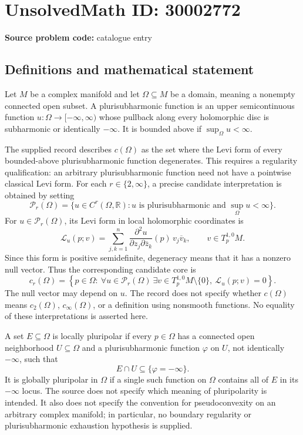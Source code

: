 \documentclass[11pt]{article}
\newcommand{\R}{\mathbb{R}}
\begin{document}
\section*{UnsolvedMath ID: 30002772}
\textbf{Source problem code:} catalogue entry
\subsection{Definitions and mathematical statement}
Let \(M\) be a complex manifold and let \(\Omega\subseteq M\) be a domain, meaning a nonempty connected open subset. A plurisubharmonic function is an upper semicontinuous function \(u:\Omega\to[-\infty,\infty)\) whose pullback along every holomorphic disc is subharmonic or identically \(-\infty\). It is bounded above if \(\sup_{\Omega}u<\infty\).

The supplied record describes \(c(\Omega)\) as the set where the Levi form of every bounded-above plurisubharmonic function degenerates. This requires a regularity qualification: an arbitrary plurisubharmonic function need not have a pointwise classical Levi form. For each \(r\in\{2,\infty\}\), a precise candidate interpretation is obtained by setting
\[
\mathcal P_r(\Omega)=\{u\in C^r(\Omega,\R):u\text{ is plurisubharmonic and }\sup_{\Omega}u<\infty\}.
\]
For \(u\in\mathcal P_r(\Omega)\), its Levi form in local holomorphic coordinates is
\[
\mathcal L_u(p;v)=\sum_{j,k=1}^{n}\frac{\partial^2u}{\partial z_j\partial\overline z_k}(p)\,v_j\overline v_k,
\qquad v\in T_p^{1,0}M.
\]
Since this form is positive semidefinite, degeneracy means that it has a nonzero null vector. Thus the corresponding candidate core is
\[
c_r(\Omega)=\left\{p\in\Omega:\ \forall u\in\mathcal P_r(\Omega)\ \exists v\in T_p^{1,0}M\setminus\{0\},\ \mathcal L_u(p;v)=0\right\}.
\]
The null vector may depend on \(u\). The record does not specify whether \(c(\Omega)\) means \(c_2(\Omega)\), \(c_\infty(\Omega)\), or a definition using nonsmooth functions. No equality of these interpretations is asserted here.

A set \(E\subseteq\Omega\) is locally pluripolar if every \(p\in\Omega\) has a connected open neighborhood \(U\subseteq\Omega\) and a plurisubharmonic function \(\varphi\) on \(U\), not identically \(-\infty\), such that
\[
E\cap U\subseteq\{\varphi=-\infty\}.
\]
It is globally pluripolar in \(\Omega\) if a single such function on \(\Omega\) contains all of \(E\) in its \(-\infty\) locus. The source does not specify which meaning of pluripolarity is intended. It also does not specify the convention for pseudoconvexity on an arbitrary complex manifold; in particular, no boundary regularity or plurisubharmonic exhaustion hypothesis is supplied.
\end{document}
